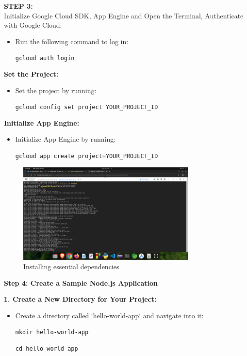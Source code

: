 \documentclass[12pt]{article}
\begin{document}
\begin{spacing}{1.5}
\begin{adjustwidth}{0cm}{0cm}
\begin{justify}
\textbf{STEP 3:} \\
Initialize Google Cloud SDK, App Engine and Open the Terminal, Authenticate with Google Cloud:
\begin{itemize}
    \item Run the following command to log in:
    \begin{center}
    \texttt{gcloud auth login}
    \end{center}
\end{itemize}

\textbf{Set the Project:}
\begin{itemize}
    \item Set the project by running:
    \begin{center}
    \texttt{gcloud config set project YOUR\_PROJECT\_ID}
    \end{center}
\end{itemize}

\textbf{Initialize App Engine:}
\begin{itemize}
    \item Initialize App Engine by running:
    \begin{center}
    \texttt{gcloud app create project=YOUR\_PROJECT\_ID}
    \end{center}
\end{itemize}

\begin{figure}[H]
    \centering
    \includegraphics[width=0.8\textwidth]{exp 5/s9.png}
    \caption{Installing essential dependencies}
    \label{fig: 1}
\end{figure}

\textbf{Step 4: Create a Sample Node.js Application}

\textbf{1. Create a New Directory for Your Project:}
\begin{itemize}
    \item Create a directory called ‘hello-world-app‘ and navigate into it:
    \begin{center}
    \texttt{mkdir hello-world-app}
    \end{center}
    \begin{center}
    \texttt{cd hello-world-app}
    \end{center}
\end{itemize}


\end{justify}
\end{adjustwidth}
\end{spacing}
\end{document}

